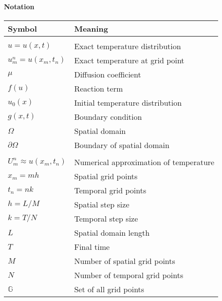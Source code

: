 \paragraph{Notation}
\begin{tabular}{ll}
  \textbf{Symbol}               & \textbf{Meaning}                       \\
  \hline                                                                 \\[-1em]
  \(u = u(x, t)\)               & Exact temperature distribution         \\
  \(u_m^n = u(x_m, t_n)\)       & Exact temperature at grid point        \\
  \(\mu\)                       & Diffusion coefficient                  \\
  \(f(u)\)                      & Reaction term                          \\
  \(u_0(x)\)                    & Initial temperature distribution       \\
  \(g(x, t)\)                   & Boundary condition                     \\
  \(\Omega\)                    & Spatial domain                         \\
  \(\partial \Omega\)           & Boundary of spatial domain             \\
  \hline                                                                 \\[-1em]
  \(U_m^n \approx u(x_m, t_n)\) & Numerical approximation of temperature \\
  \(x_m = m h\)                 & Spatial grid points                    \\
  \(t_n = n k\)                 & Temporal grid points                   \\
  \(h = L/M\)                   & Spatial step size                      \\
  \(k =T/N\)                    & Temporal step size                     \\
  \(L\)                         & Spatial domain length                  \\
  \(T\)                         & Final time                             \\
  \(M\)                         & Number of spatial grid points          \\
  \(N\)                         & Number of temporal grid points         \\
  \(\mathbb{G}\)                & Set of all grid points                 \\
  \hline
\end{tabular}
